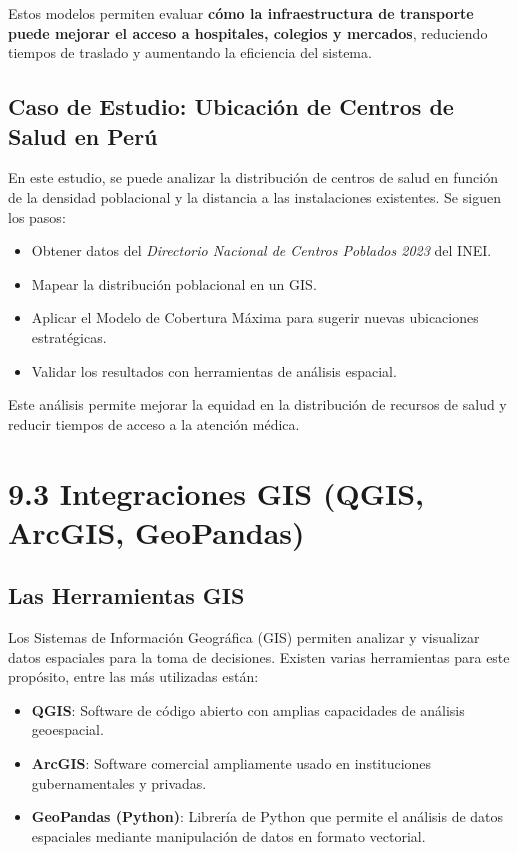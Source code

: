 \documentclass{article}
\begin{document}
{Estos modelos permiten evaluar \textbf{cómo la infraestructura de transporte puede mejorar el acceso a hospitales, colegios y mercados}, reduciendo tiempos de traslado y aumentando la eficiencia del sistema.

\subsection*{Caso de Estudio: Ubicación de Centros de Salud en Perú}
En este estudio, se puede analizar la distribución de centros de salud en función de la densidad poblacional y la distancia a las instalaciones existentes. Se siguen los pasos:

\begin{itemize}
	\item Obtener datos del \textit{Directorio Nacional de Centros Poblados 2023} del INEI.
	\item Mapear la distribución poblacional en un GIS.
	\item Aplicar el Modelo de Cobertura Máxima para sugerir nuevas ubicaciones estratégicas.
	\item Validar los resultados con herramientas de análisis espacial.
\end{itemize}

Este análisis permite mejorar la equidad en la distribución de recursos de salud y reducir tiempos de acceso a la atención médica. 

\section*{9.3 Integraciones GIS (QGIS, ArcGIS, GeoPandas)}

\subsection*{Las Herramientas GIS}
Los Sistemas de Información Geográfica (GIS) permiten analizar y visualizar datos espaciales para la toma de decisiones. Existen varias herramientas para este propósito, entre las más utilizadas están:

\begin{itemize}
	\item \textbf{QGIS}: Software de código abierto con amplias capacidades de análisis geoespacial.
	\item \textbf{ArcGIS}: Software comercial ampliamente usado en instituciones gubernamentales y privadas.
	\item \textbf{GeoPandas (Python)}: Librería de Python que permite el análisis de datos espaciales mediante manipulación de datos en formato vectorial.
\end{itemize}

}
\end{document}
